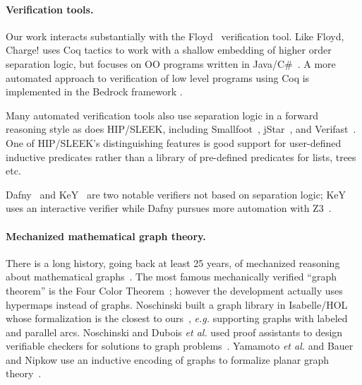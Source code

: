\vspace{-1ex}
\paragraph{Verification tools.}
Our work interacts substantially with the Floyd~\cite{appel:programlogics} verification 
tool.  Like Floyd, Charge! uses Coq tactics to work with a shallow embedding of higher 
order separation logic, but focuses on OO programs written in 
Java/C\#~\cite{bengtson:charge}.  A  more automated approach to verification of low 
level programs using Coq is implemented in the Bedrock framework \cite{chlipala:bedrock}.

Many automated verification tools also use separation logic in a forward reasoning style 
as does HIP/SLEEK, including Smallfoot~\cite{berdine:smallfoot}, 
jStar~\cite{distefanop08}, and Verifast~\cite{jacobs:verifast}.  One of HIP/SLEEK's 
distinguishing features is good support for user-defined inductive predicates rather 
than a library of pre-defined predicates for lists, trees etc.

Dafny~\cite{leino10} and KeY~\cite{beckert:2007} are two notable verifiers not based 
on separation logic; KeY uses an interactive verifier while Dafny pursues more 
automation with Z3~\cite{moura2008}.

\vspace{-1ex}
\paragraph{Mechanized mathematical graph theory.} There is a long history,
going back at least 25 years, of mechanized reasoning about mathematical
graphs~\cite{wong1991}.  The most famous mechanically verified ``graph theorem''
is the Four Color Theorem~\cite{gonthier2005computer}; however
the development actually uses hypermaps instead of graphs.
Noschinski built a graph library in Isabelle/HOL whose formalization
is the closest to ours~\cite{noschinski2015}, \emph{e.g.} supporting
graphs with labeled and parallel arcs.
Noschinski and Dubois \emph{et al.} used proof assistants to design verifiable
checkers for solutions to graph problems~\cite{noschinski2015formalizing,dubois2015graphes}.
Yamamoto \emph{et al.} and Bauer and Nipkow use an inductive
encoding of graphs to formalize planar graph theory~\cite{yamamoto1995formalization,bauer20025}.

